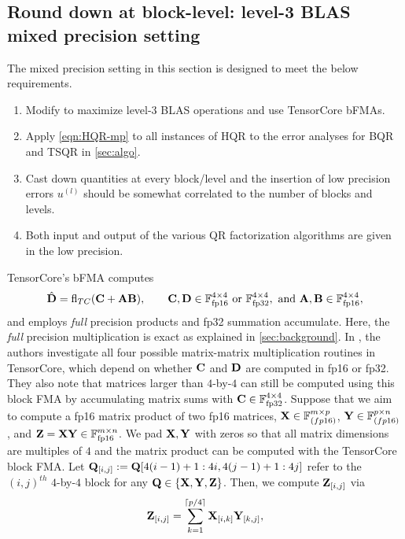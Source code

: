 \subsection{Round down at block-level: level-3 BLAS mixed precision setting}\label{sec:mp-3}
The mixed precision setting in this section is designed to meet the below requirements.
\begin{enumerate}
	\item Modify  to maximize level-3 BLAS operations and use TensorCore bFMAs. 
	\item Apply \cref{eqn:HQR-mp} to all instances of HQR to the error analyses for BQR and TSQR in \cref{sec:algo}.
	\item Cast down quantities at every block/level and the insertion of low precision errors $u^{(l)}$ should be somewhat correlated to the number of blocks and levels. 
	\item Both input and output of the various QR factorization algorithms are given in the low precision. 
\end{enumerate}
TensorCore's bFMA computes 
\begin{equation}
\hat{\bb{D}} =\fl_{TC}(\bb{C} + \bb{A}\bb{B}),\qquad \bb{C},\bb{D}\in\F_{\text{fp16}}^{4\times 4}\text{ or }\F_{\text{fp32}}^{4\times 4},\text{ and } \bb{A},\bb{B}\in\F_{\text{fp16}}^{4\times 4},\label{eqn:bFMA}
\end{equation}
and employs \emph{full} precision products and fp32 summation accumulate.
Here, the \emph{full} precision multiplication is exact as explained in \cref{sec:background}.
In \cite{Blanchard2019}, the authors investigate all four possible matrix-matrix multiplication routines in TensorCore, which depend on whether $\mathbf{C}$ and $\mathbf{D}$ are computed in fp16 or fp32. 
They also note that matrices larger than $4$-by-$4$ can still be computed using this block FMA by accumulating matrix sums with $\mathbf{C}\in\mathbb{F}_{\text{fp32}}^{4\times 4}$.
Suppose that we aim to compute a fp16 matrix product of two fp16 matrices, $\mathbf{X}\in\mathbb{F}_{(fp16)}^{m\times p}$, $\mathbf{Y}\in\mathbb{F}_{(fp16)}^{p\times n}$, and $\mathbf{Z}=\mathbf{XY}\in\mathbb{F}_{\text{fp16}}^{m\times n}$.
We pad $\mathbf{X},\mathbf{Y}$ with zeros so that all matrix dimensions are multiples of $4$ and the matrix product can be computed with the TensorCore block FMA.
Let $\mathbf{Q}_{[i,j]}:= \mathbf{Q}[4(i-1)+1:4i,4(j-1)+1:4j]$ refer to the $(i,j)^{th}$ $4$-by-$4$ block for any $\mathbf{Q}\in\{\mathbf{X},\mathbf{Y},\mathbf{Z}\}$.
Then, we compute $\mathbf{Z}_{[i,j]}$ via \[
\mathbf{Z}_{[i,j]} = \sum_{k=1}^{\lceil p/4\rceil} \mathbf{X}_{[i,k]} \mathbf{Y}_{[k,j]},
\]
